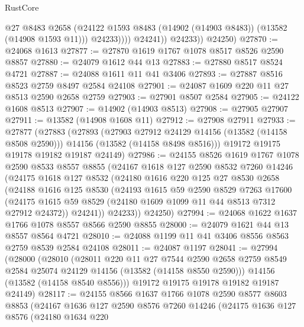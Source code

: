 \begin{lexlean}{RustCore}
\begin{coremodule}
                      @27
                      @8483
                      @2658
                      (@24122 @1593 @8483 (@14902 (@14903 @8483)) (@13582 (@14908 @1593 @11)))
                      @24233))))
              @24241))
          @24233))
      @24250)
@27870 := @24068 @1613
@27877 := @27870 @1619 @1767 @1078 @8517 @8526 @2590 @8857
@27880 := @24079 @1612 @44 @13
@27883 := @27880 @8517 @8524 @4721
@27887 := @24088 @1611 @11 @41 @3406
@27893 := @27887 @8516 @8523 @2759 @8497 @2584 @24108
@27901 := @24087 @1609 @220 @11 @27 @8513 @2590 @2658 @2759
@27903 := @27901 @8507 @2584
@27905 := @24122 @1608 @8513
@27907 := @14902 (@14903 @8513)
@27908 := @27905 @27907
@27911 := @13582 (@14908 @1608 @11)
@27912 := @27908 @27911
@27933 := @27877
    (@27883
      (@27893
        (@27903 @27912 @24129 @14156 (@13582 (@14158 @8508 @2590)))
        @14156
        (@13582 (@14158 @8498 @8516)))
      @19172
      @19175
      @19178
      @19182
      @19187
      @24149)
@27986 := @24155
    @8526
    @1619
    @1767
    @1078
    @2590
    @8533
    @8557
    @8855
    (@24167
      @1618
      @127
      @2590
      @8532
      @7260
      @14246
      (@24175
        @1618
        @127
        @8532
        (@24180
          @1616
          @220
          @125
          @27
          @8530
          @2658
          (@24188
            @1616
            @125
            @8530
            (@24193
              @1615
              @59
              @2590
              @8529
              @7263
              @17600
              (@24175 @1615 @59 @8529 (@24180 @1609 @1099 @11 @44 @8513 @7312 @27912 @24372))
              @24241))
          @24233))
      @24250)
@27994 := @24068 @1622 @1637 @1766 @1078 @8557 @8566 @2590 @8855
@28000 := @24079 @1621 @44 @13 @8557 @8564 @4721
@28010 := @24088 @1199 @11 @41 @3406 @8556 @8563 @2759 @8539 @2584 @24108
@28011 := @24087 @1197
@28041 := @27994
    (@28000
      (@28010
        (@28011
          @220
          @11
          @27
          @7544
          @2590
          @2658
          @2759
          @8549
          @2584
          @25074
          @24129
          @14156
          (@13582 (@14158 @8550 @2590)))
        @14156
        (@13582 (@14158 @8540 @8556)))
      @19172
      @19175
      @19178
      @19182
      @19187
      @24149)
@28117 := @24155
    @8566
    @1637
    @1766
    @1078
    @2590
    @8577
    @8603
    @8853
    (@24167
      @1636
      @127
      @2590
      @8576
      @7260
      @14246
      (@24175
        @1636
        @127
        @8576
        (@24180
          @1634
          @220

\end{coremodule}
\end{lexlean}

